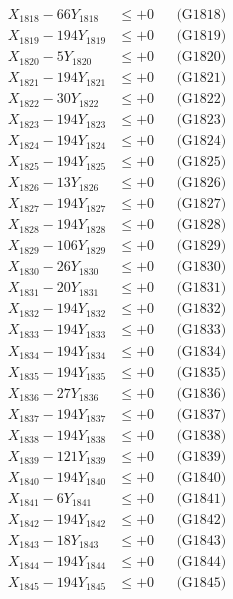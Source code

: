 \documentclass[a4paper,10pt]{article}
\begin{document}
{\begin{align}
X_{1818} - 66Y_{1818} &\leq +0 && \text{(G1818)} \\
X_{1819} - 194Y_{1819} &\leq +0 && \text{(G1819)} \\
X_{1820} - 5Y_{1820} &\leq +0 && \text{(G1820)} \\
\allowbreak
X_{1821} - 194Y_{1821} &\leq +0 && \text{(G1821)} \\
X_{1822} - 30Y_{1822} &\leq +0 && \text{(G1822)} \\
X_{1823} - 194Y_{1823} &\leq +0 && \text{(G1823)} \\
X_{1824} - 194Y_{1824} &\leq +0 && \text{(G1824)} \\
X_{1825} - 194Y_{1825} &\leq +0 && \text{(G1825)} \\
X_{1826} - 13Y_{1826} &\leq +0 && \text{(G1826)} \\
X_{1827} - 194Y_{1827} &\leq +0 && \text{(G1827)} \\
X_{1828} - 194Y_{1828} &\leq +0 && \text{(G1828)} \\
X_{1829} - 106Y_{1829} &\leq +0 && \text{(G1829)} \\
X_{1830} - 26Y_{1830} &\leq +0 && \text{(G1830)} \\
\allowbreak
X_{1831} - 20Y_{1831} &\leq +0 && \text{(G1831)} \\
X_{1832} - 194Y_{1832} &\leq +0 && \text{(G1832)} \\
X_{1833} - 194Y_{1833} &\leq +0 && \text{(G1833)} \\
X_{1834} - 194Y_{1834} &\leq +0 && \text{(G1834)} \\
X_{1835} - 194Y_{1835} &\leq +0 && \text{(G1835)} \\
X_{1836} - 27Y_{1836} &\leq +0 && \text{(G1836)} \\
X_{1837} - 194Y_{1837} &\leq +0 && \text{(G1837)} \\
X_{1838} - 194Y_{1838} &\leq +0 && \text{(G1838)} \\
X_{1839} - 121Y_{1839} &\leq +0 && \text{(G1839)} \\
X_{1840} - 194Y_{1840} &\leq +0 && \text{(G1840)} \\
\allowbreak
X_{1841} - 6Y_{1841} &\leq +0 && \text{(G1841)} \\
X_{1842} - 194Y_{1842} &\leq +0 && \text{(G1842)} \\
X_{1843} - 18Y_{1843} &\leq +0 && \text{(G1843)} \\
X_{1844} - 194Y_{1844} &\leq +0 && \text{(G1844)} \\
X_{1845} - 194Y_{1845} &\leq +0 && \text{(G1845)} \\

\end{align}}
\end{document}
